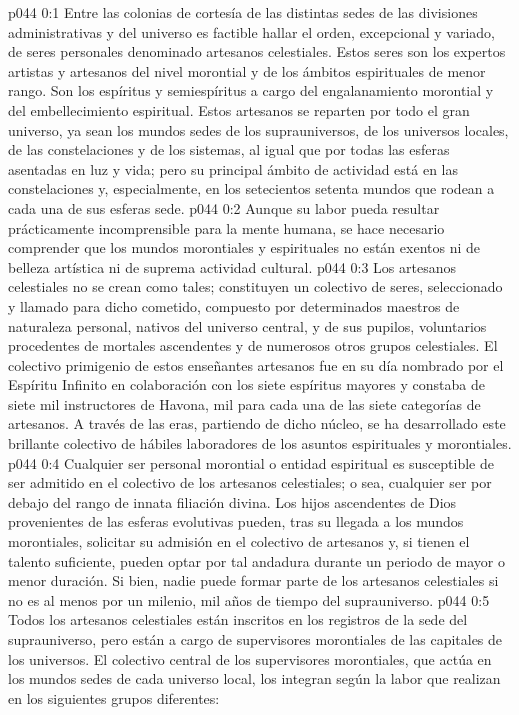 \author{Arcángel}
\vs p044 0:1 Entre las colonias de cortesía de las distintas sedes de las divisiones administrativas y del universo es factible hallar el orden, excepcional y variado, de seres personales denominado artesanos celestiales. Estos seres son los expertos artistas y artesanos del nivel morontial y de los ámbitos espirituales de menor rango. Son los espíritus y semiespíritus a cargo del engalanamiento morontial y del embellecimiento espiritual. Estos artesanos se reparten por todo el gran universo, ya sean los mundos sedes de los suprauniversos, de los universos locales, de las constelaciones y de los sistemas, al igual que por todas las esferas asentadas en luz y vida; pero su principal ámbito de actividad está en las constelaciones y, especialmente, en los setecientos setenta mundos que rodean a cada una de sus esferas sede.
\vs p044 0:2 Aunque su labor pueda resultar prácticamente incomprensible para la mente humana, se hace necesario comprender que los mundos morontiales y espirituales no están exentos ni de belleza artística ni de suprema actividad cultural.
\vs p044 0:3 \pc Los artesanos celestiales no se crean como tales; constituyen un colectivo de seres, seleccionado y llamado para dicho cometido, compuesto por determinados maestros de naturaleza personal, nativos del universo central, y de sus pupilos, voluntarios procedentes de mortales ascendentes y de numerosos otros grupos celestiales. El colectivo primigenio de estos enseñantes artesanos fue en su día nombrado por el Espíritu Infinito en colaboración con los siete espíritus mayores y constaba de siete mil instructores de Havona, mil para cada una de las siete categorías de artesanos. A través de las eras, partiendo de dicho núcleo, se ha desarrollado este brillante colectivo de hábiles laboradores de los asuntos espirituales y morontiales.
\vs p044 0:4 Cualquier ser personal morontial o entidad espiritual es susceptible de ser admitido en el colectivo de los artesanos celestiales; o sea, cualquier ser por debajo del rango de innata filiación divina. Los hijos ascendentes de Dios provenientes de las esferas evolutivas pueden, tras su llegada a los mundos morontiales, solicitar su admisión en el colectivo de artesanos y, si tienen el talento suficiente, pueden optar por tal andadura durante un periodo de mayor o menor duración. Si bien, nadie puede formar parte de los artesanos celestiales si no es al menos por un milenio, mil años de tiempo del suprauniverso.
\vs p044 0:5 Todos los artesanos celestiales están inscritos en los registros de la sede del suprauniverso, pero están a cargo de supervisores morontiales de las capitales de los universos. El colectivo central de los supervisores morontiales, que actúa en los mundos sedes de cada universo local, los integran según la labor que realizan en los siguientes grupos diferentes:
